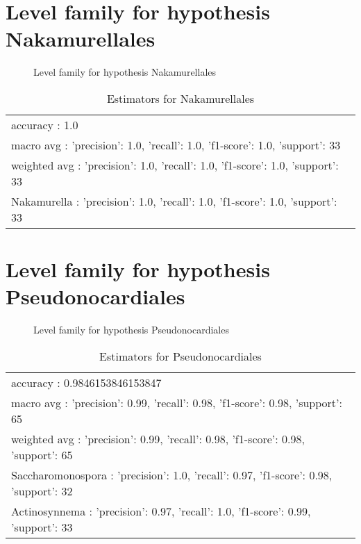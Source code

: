 \documentclass[12pt]{article}
\begin{document}
\clearpage
\pagebreak[4]
\section*{Level family for hypothesis Nakamurellales}
\begin{figure}[h]
\centering


\caption{Level family for hypothesis Nakamurellales}
\label{f-Level family for hypothesis Nakamurellales}
\end{figure}
\begin{table}[htp]
\begin{tabular}{l}
accuracy : 1.0 \\
macro avg : {'precision': 1.0, 'recall': 1.0, 'f1-score': 1.0, 'support': 33} \\
weighted avg : {'precision': 1.0, 'recall': 1.0, 'f1-score': 1.0, 'support': 33} \\
Nakamurella : {'precision': 1.0, 'recall': 1.0, 'f1-score': 1.0, 'support': 33}
\end{tabular}
\caption*{Estimators for Nakamurellales}
\end{table}




\clearpage
\pagebreak[4]
\section*{Level family for hypothesis Pseudonocardiales}
\begin{figure}[h]
\centering


\caption{Level family for hypothesis Pseudonocardiales}
\label{f-Level family for hypothesis Pseudonocardiales}
\end{figure}
\begin{table}[htp]
\begin{tabular}{l}
accuracy : 0.9846153846153847 \\
macro avg : {'precision': 0.99, 'recall': 0.98, 'f1-score': 0.98, 'support': 65} \\
weighted avg : {'precision': 0.99, 'recall': 0.98, 'f1-score': 0.98, 'support': 65} \\
Saccharomonospora : {'precision': 1.0, 'recall': 0.97, 'f1-score': 0.98, 'support': 32} \\
Actinosynnema : {'precision': 0.97, 'recall': 1.0, 'f1-score': 0.99, 'support': 33}
\end{tabular}
\caption*{Estimators for Pseudonocardiales}
\end{table}
\end{document}

